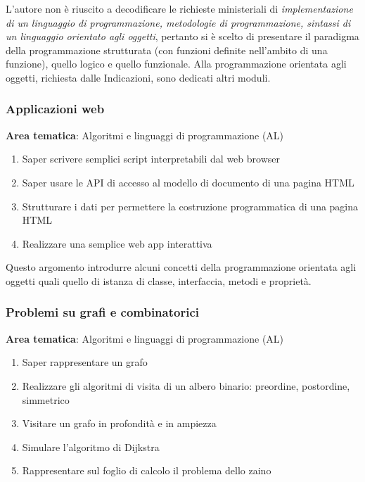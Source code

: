 L'autore non è riuscito a decodificare le richieste ministeriali
di \textit{implementazione di un linguaggio di programmazione,
metodologie di programmazione, sintassi di un linguaggio
orientato agli oggetti}, pertanto si è scelto di presentare il paradigma
della programmazione strutturata (con funzioni definite nell'ambito 
di una funzione), %
quello logico %
e quello funzionale. %
Alla programmazione orientata agli oggetti, richiesta dalle Indicazioni, sono dedicati altri moduli.




\subsubsection[Web app]{Applicazioni web}
\label{sec:web-app}

\noindent\textbf{Area tematica}: Algoritmi e linguaggi di programmazione (AL)

    
\begin{enumerate}
  \item Saper scrivere semplici script interpretabili dal web browser
  \item Saper usare le API di accesso al modello di documento di una pagina HTML
  \item Strutturare i dati per permettere la costruzione programmatica di una pagina HTML
  \item Realizzare una semplice web app interattiva
\end{enumerate}

Questo argomento introdurre alcuni concetti della programmazione orientata agli oggetti
quali quello di istanza di classe, interfaccia, metodi e proprietà.

\subsubsection[Grafi]{Problemi su grafi e combinatorici}
\label{sec:grafi}

\noindent\textbf{Area tematica}: Algoritmi e linguaggi di programmazione (AL)

    
\begin{enumerate}
  \item Saper rappresentare un grafo
  \item Realizzare gli algoritmi di visita di un albero binario: preordine, postordine, simmetrico%
  \item Visitare un grafo in profondità e in ampiezza
  \item Simulare l'algoritmo di Dijkstra
  \item Rappresentare sul foglio di calcolo il problema dello zaino
\end{enumerate}

